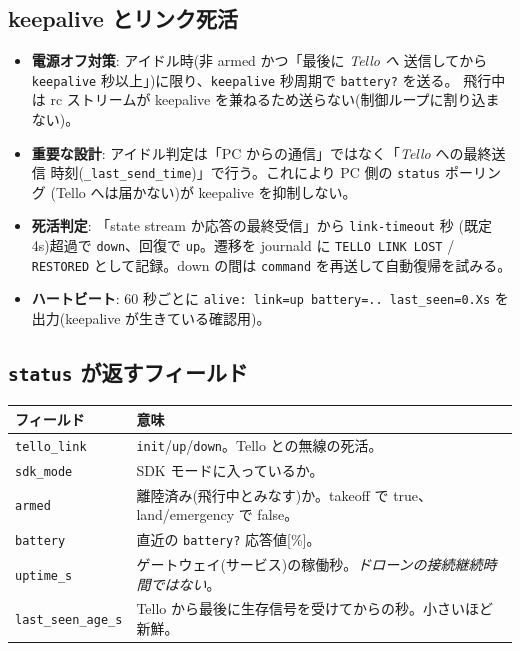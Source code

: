 \documentclass[11pt,a4paper]{ltjsarticle}
\newcommand{\code}[1]{\texttt{\small #1}}
\begin{document}
\subsection{keepalive とリンク死活}
\begin{itemize}[leftmargin=1.4em]
  \item \textbf{電源オフ対策}: アイドル時(非 armed かつ「最後に \emph{Tello へ} 送信してから
        \code{keepalive} 秒以上」)に限り、\code{keepalive} 秒周期で \code{battery?} を送る。
        飛行中は rc ストリームが keepalive を兼ねるため送らない(制御ループに割り込まない)。
  \item \textbf{重要な設計}: アイドル判定は「PC からの通信」ではなく「\emph{Tello} への最終送信
        時刻(\code{\_last\_send\_time})」で行う。これにより PC 側の \code{status} ポーリング
        (Tello へは届かない)が keepalive を抑制しない。
  \item \textbf{死活判定}: 「state stream か応答の最終受信」から \code{link-timeout} 秒
        (既定 4s)超過で \code{down}、回復で \code{up}。遷移を journald に \code{TELLO LINK LOST}
        / \code{RESTORED} として記録。down の間は \code{command} を再送して自動復帰を試みる。
  \item \textbf{ハートビート}: 60 秒ごとに \code{alive: link=up battery=.. last\_seen=0.Xs} を
        出力(keepalive が生きている確認用)。
\end{itemize}

\subsection{\code{status} が返すフィールド}
\begin{longtable}{@{}p{4.6cm}p{10.4cm}@{}}
\toprule
\textbf{フィールド} & \textbf{意味} \\
\midrule
\endhead
\code{tello\_link} & \code{init}/\code{up}/\code{down}。Tello との無線の死活。\\
\code{sdk\_mode} & SDK モードに入っているか。\\
\code{armed} & 離陸済み(飛行中とみなす)か。takeoff で true、land/emergency で false。\\
\code{battery} & 直近の \code{battery?} 応答値[\%]。\\
\code{uptime\_s} & ゲートウェイ(サービス)の稼働秒。\emph{ドローンの接続継続時間ではない}。\\
\code{last\_seen\_age\_s} & Tello から最後に生存信号を受けてからの秒。小さいほど新鮮。\\
\bottomrule
\end{longtable}
\end{document}
